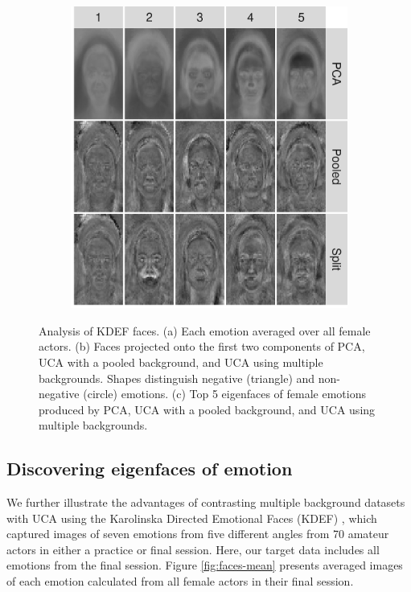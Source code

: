 \documentclass[nocrop]{bioinfo}
\begin{document}
\begin{methods}
\begin{figure}[!ht]
\begin{subfigure}[b]{.49\linewidth}
    \includegraphics[width=\textwidth]{figure/all_Afraid_removed.png}
    \caption{}
   \label{fig:faces-eigenfaces}
    \end{subfigure}
    \caption{Analysis of KDEF faces. (a) Each emotion averaged over all female actors. (b) Faces projected onto the first two components of PCA, UCA with a pooled background, and UCA using multiple backgrounds. Shapes distinguish negative (triangle) and non-negative (circle) emotions. (c) Top 5 eigenfaces of female emotions produced by PCA, UCA with a pooled background, and UCA using multiple backgrounds.}
\end{figure}

\subsection{\label{sec:faces}Discovering eigenfaces of emotion}

        We further illustrate the advantages of contrasting multiple background datasets with UCA using the Karolinska Directed Emotional Faces (KDEF) \cite{Calvo2008}, which captured images of seven emotions from five different angles from 70 amateur actors in either a practice or final session. Here, our target data includes all emotions from the final session. Figure \ref{fig:faces-mean} presents averaged images of each emotion calculated from all female actors in their final session. 


\end{methods}
\end{document}
